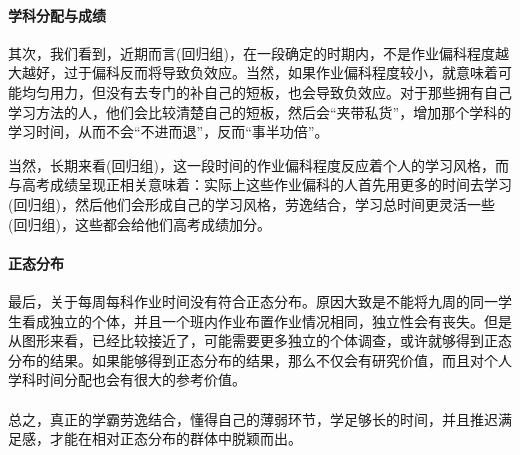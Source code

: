 \documentclass{article}
\begin{document}
\begin{CJK}{UTF8}{song}
\paragraph{学科分配与成绩}
其次，我们看到，近期而言(回归组\uppercase\expandafter{})，在一段确定的时期内，不是作业偏科程度越大越好，过于偏科反而将导致负效应。当然，如果作业偏科程度较小，就意味着可能均匀用力，但没有去专门的补自己的短板，也会导致负效应。对于那些拥有自己学习方法的人，他们会比较清楚自己的短板，然后会“夹带私货”，增加那个学科的学习时间，从而不会“不进而退”，反而“事半功倍”。

当然，长期来看(回归组\uppercase\expandafter{})，这一段时间的作业偏科程度反应着个人的学习风格，而与高考成绩呈现正相关意味着：实际上这些作业偏科的人首先用更多的时间去学习(回归组\uppercase\expandafter{})，然后他们会形成自己的学习风格，劳逸结合，学习总时间更灵活一些(回归组\uppercase\expandafter{})，这些都会给他们高考成绩加分。

\paragraph{正态分布}
最后，关于每周每科作业时间没有符合正态分布。原因大致是不能将九周的同一学生看成独立的个体，并且一个班内作业布置作业情况相同，独立性会有丧失。但是从图形来看，已经比较接近了，可能需要更多独立的个体调查，或许就够得到正态分布的结果。如果能够得到正态分布的结果，那么不仅会有研究价值，而且对个人学科时间分配也会有很大的参考价值。

\paragraph{}
总之，真正的学霸劳逸结合，懂得自己的薄弱环节，学足够长的时间，并且推迟满足感，才能在相对正态分布的群体中脱颖而出。

\newpage

\appendix

\end{CJK}
\end{document}
